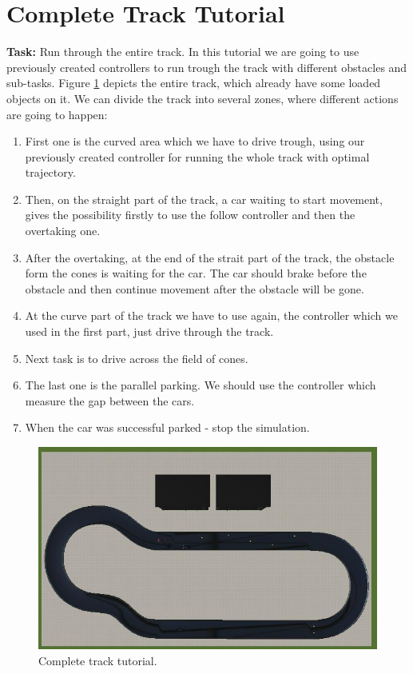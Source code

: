 \section{Complete Track Tutorial}
\textbf{Task:} Run through the entire track. \newline \newline
In this tutorial we are going to use previously created controllers to run trough the track with different obstacles and sub-tasks. Figure \ref{fig:tutorial11-track} depicts the entire track, which already have some loaded objects on it. We can divide the track into several zones, where different actions are going to happen:
\begin{enumerate}
    \item First one is the curved area which we have to drive trough, using our previously created controller for running the whole track with optimal trajectory.
    \item Then, on the straight part of the track, a car waiting to start movement, gives the possibility firstly to use the follow controller and then the overtaking one.
    \item After the overtaking, at the end of the strait part of the track, the obstacle form the cones is waiting for the car. The car should brake before the obstacle and then continue movement after the obstacle will be gone.
    \item At the curve part of the track we have to use again, the controller which we used in the first part, just drive through the track.
    \item Next task is to drive across the field of cones.
    \item The last one is the parallel parking. We should use the controller which measure the gap between the cars.
    \item When the car was successful parked - stop the simulation.
\end{enumerate}
\begin{figure}[ht]
    \centering
    \includegraphics[width=\linewidth]{src/pic/track_tutorial11}
    \caption{Complete track tutorial.}
    \label{fig:tutorial11-track}
\end{figure}
